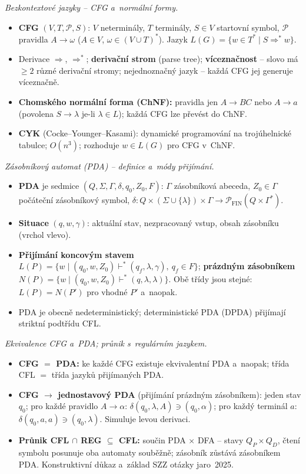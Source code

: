 \documentclass[11pt,a4paper]{article}
\begin{document}
\begin{poznamka}
\smallskip
\emph{Bezkontextové jazyky -- CFG a~normální formy.}
\begin{itemize}
  \item \textbf{CFG} $(V,T,\mathcal P,S)$: $V$ neterminály, $T$ terminály, $S\in V$ startovní symbol, $\mathcal P$ pravidla $A\to\omega$ ($A\in V$, $\omega\in(V\cup T)^*$). Jazyk $L(G)=\{w\in T^*\mid S\Rightarrow^* w\}$.
  \item Derivace $\Rightarrow$, $\Rightarrow^*$; \textbf{derivační strom} (parse tree); \textbf{víceznačnost} -- slovo má $\ge 2$ různé derivační stromy; nejednoznačný jazyk -- každá CFG jej generuje víceznačně.
  \item \textbf{Chomského normální forma (ChNF):} pravidla jen $A\to BC$ nebo $A\to a$ (povolena $S\to\lambda$ je-li $\lambda\in L$); každá CFG lze převést do ChNF.
  \item \textbf{CYK} (Cocke--Younger--Kasami): dynamické programování na trojúhelnické tabulce; $O(n^3)$; rozhoduje $w\in L(G)$ pro CFG v~ChNF.
\end{itemize}

\smallskip
\emph{Zásobníkový automat (PDA) -- definice a~módy přijímání.}
\begin{itemize}
  \item \textbf{PDA} je sedmice $(Q,\Sigma,\Gamma,\delta,q_0,Z_0,F)$: $\Gamma$ zásobníková abeceda, $Z_0\in\Gamma$ počáteční zásobníkový symbol, $\delta\colon Q\times(\Sigma\cup\{\lambda\})\times\Gamma\to\mathcal P_{\mathrm{FIN}}(Q\times\Gamma^*)$.
  \item \textbf{Situace} $(q,w,\gamma)$: aktuální stav, nezpracovaný vstup, obsah zásobníku (vrchol vlevo).
  \item \textbf{Přijímání koncovým stavem} $L(P)=\{w\mid(q_0,w,Z_0)\vdash^*(q_f,\lambda,\gamma),\ q_f\in F\}$; \textbf{prázdným zásobníkem} $N(P)=\{w\mid(q_0,w,Z_0)\vdash^*(q,\lambda,\lambda)\}$. Obě třídy jsou stejné: $L(P)=N(P')$ pro vhodné $P'$ a~naopak.
  \item PDA je obecně nedeterministický; deterministické PDA (DPDA) přijímají striktní podtřídu CFL.
\end{itemize}

\smallskip
\emph{Ekvivalence CFG a~PDA; průnik s~regulárním jazykem.}
\begin{itemize}
  \item \textbf{CFG $=$ PDA:} ke každé CFG existuje ekvivalentní PDA a~naopak; třída CFL $=$ třída jazyků přijímaných PDA.
  \item \textbf{CFG $\to$ jednostavový PDA} (přijímání prázdným zásobníkem): jeden stav $q_0$; pro každé pravidlo $A\to\alpha$: $\delta(q_0,\lambda,A)\ni(q_0,\alpha)$; pro každý terminál $a$: $\delta(q_0,a,a)\ni(q_0,\lambda)$. Simuluje levou derivaci.
  \item \textbf{Průnik CFL $\cap$ REG $\subseteq$ CFL:} součin PDA $\times$ DFA -- stavy $Q_P\times Q_D$, čtení symbolu posunuje oba automaty souběžně; zásobník zůstává zásobníkem PDA. Konstruktivní důkaz a~základ SZZ otázky jaro~2025.
\end{itemize}


\end{poznamka}
\end{document}
